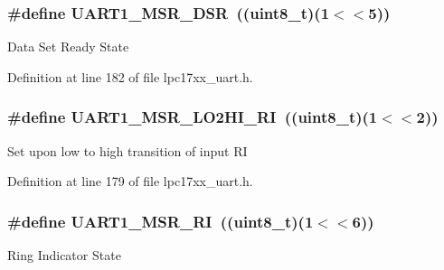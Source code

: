 \subsubsection[{\texorpdfstring{U\+A\+R\+T1\+\_\+\+M\+S\+R\+\_\+\+D\+SR}{UART1_MSR_DSR}}]{\setlength{\rightskip}{0pt plus 5cm}\#define U\+A\+R\+T1\+\_\+\+M\+S\+R\+\_\+\+D\+SR~(({\bf uint8\+\_\+t})(1$<$$<$5))}\hypertarget{group___u_a_r_t___private___macros_ga30f158b6d377a4ce3720d4ce6864abd3}{}\label{group___u_a_r_t___private___macros_ga30f158b6d377a4ce3720d4ce6864abd3}
Data Set Ready State 

Definition at line 182 of file lpc17xx\+\_\+uart.\+h.

\subsubsection[{\texorpdfstring{U\+A\+R\+T1\+\_\+\+M\+S\+R\+\_\+\+L\+O2\+H\+I\+\_\+\+RI}{UART1_MSR_LO2HI_RI}}]{\setlength{\rightskip}{0pt plus 5cm}\#define U\+A\+R\+T1\+\_\+\+M\+S\+R\+\_\+\+L\+O2\+H\+I\+\_\+\+RI~(({\bf uint8\+\_\+t})(1$<$$<$2))}\hypertarget{group___u_a_r_t___private___macros_ga36bbd609452b3c026fa804fcd13a86c0}{}\label{group___u_a_r_t___private___macros_ga36bbd609452b3c026fa804fcd13a86c0}
Set upon low to high transition of input RI 

Definition at line 179 of file lpc17xx\+\_\+uart.\+h.

\subsubsection[{\texorpdfstring{U\+A\+R\+T1\+\_\+\+M\+S\+R\+\_\+\+RI}{UART1_MSR_RI}}]{\setlength{\rightskip}{0pt plus 5cm}\#define U\+A\+R\+T1\+\_\+\+M\+S\+R\+\_\+\+RI~(({\bf uint8\+\_\+t})(1$<$$<$6))}\hypertarget{group___u_a_r_t___private___macros_gad2a5a9572d8e00d40add31ca00264d74}{}\label{group___u_a_r_t___private___macros_gad2a5a9572d8e00d40add31ca00264d74}
Ring Indicator State 

